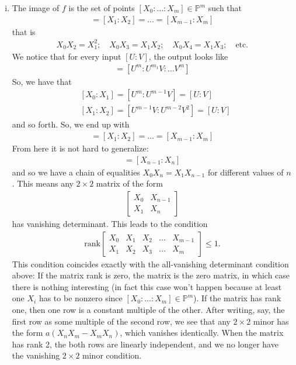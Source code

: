 \documentclass[12pt]{article}
\begin{document}
\begin{enumerate}[(i)]
	
	\item The image of $f$ is the set of points $[X_0:\dots : X_m] \in \mathbb{P}^m$ such that 
	\begin{align*}
	[X_0 : X_1] = [X_1 : X_2] = \dots = [X_{m-1} : X_m]
	\end{align*} 
	that is 
	\begin{align*}
	X_0 X_2 = X_1^2;\quad X_0X_3 = X_1 X_2; \quad X_0 X_4 = X_1X_3; \quad \mbox{etc}.
	\end{align*}
	We notice that for every input $[U:V]$, the output looks like
	\begin{align*}
	[X_0 : X_1 : \dots : X_m] = [U^m : U^{m_1}V : \dots V^m]
	\end{align*}
	So, we have that 
	\begin{align*}
	&[X_0 : X_1] = [U^m : U^{m-1}V] = [U:V]\\
	&[X_1 : X_2] = [U^{m-1}V : U^{m-2}V^2] = [U:V]
	\end{align*}
	and so forth. So, we end up with 
	\begin{align*}
	[X_0 : X_1] = [X_1 : X_2] = \dots = [X_{m-1} : X_m]
	\end{align*}
	From here it is not hard to generalize:
	\begin{align*}
	[X_0 : X_1] = [X_{n-1} : X_n]
	\end{align*}
	and so we have a chain of equalities $X_0 X_n = X_1 X_{n-1}$ for different values of $n$. This means any $2\times 2$ matrix of the form
	\begin{align*}
	\begin{bmatrix}
	X_0 & X_{n-1}\\ X_1 & X_n
	\end{bmatrix}
	\end{align*}
	has vanishing determinant. This leads to the condition
	\begin{align*}
	\mbox{rank}\begin{bmatrix}
	X_0 & X_1 & X_2 & \dots & X_{m-1}\\
	X_1 & X_2 & X_3 & \dots & X_{m}
	\end{bmatrix} \leq 1.
	\end{align*}
	This condition coincides exactly with the all-vanishing determinant condition above: If the matrix rank is zero, the matrix is the zero matrix, in which case there is nothing interesting (in fact this case won't happen because at least one $X_i$ has to be nonzero since $[X_0 : \dots : X_m] \in \mathbb{P}^m$). If the matrix has rank one, then one row is a constant multiple of the other. After writing, say, the first row as some multiple of the second row, we see that any $2\times 2$ minor has the form $a(X_n X_m - X_m X_n)$, which vanishes identically. When the matrix has rank 2, the both rows are linearly independent, and we no longer have the vanishing $2\times 2$ minor condition.
	

\end{enumerate}
\end{document}

